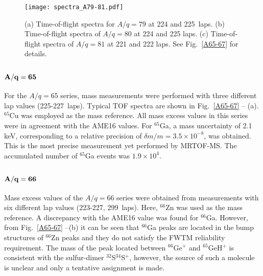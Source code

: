 \documentclass[3p]{elsarticle}
\begin{document}
\begin{figure*}
  \centering
  \texttt{[image: spectra\_A79-81.pdf]}
  \caption{(a) Time-of-flight spectra for $A/q = 79$ at 224 and 225~laps. (b) Time-of-flight spectra of $A/q = 80$ at 224 and 225 laps. (c) Time-of-flight spectra of $A/q = 81$ at 221 and 222 laps. See Fig.~\ref{A65-67} for details. \label{A79-81}}
  \vspace*{-10pt}
\end{figure*} 

\subsection{${\bf A/q = 65}$}
For the $A/q=65$ series, mass measurements were performed with three different lap values (225-227~laps). Typical TOF spectra are shown in Fig.~\ref{A65-67} -- (a). $^{65}$Cu was employed as the mass reference. All mass excess values in this series were in agreement with the AME16 values. For $^{65}$Ga, a mass uncertainty of 2.1 keV, corresponding to a relative precision of $\delta m / m = 3.5\times10^{-8}$, was obtained. This is the most precise measurement yet performed by MRTOF-MS. The accumulated number of $^{65}$Ga events was $1.9 \times 10^{4}$. 

\subsection{${\bf A/q = 66}$}
Mass excess values of the $A/q=66$ series were obtained from measurements with six different lap values (223-227, 299~laps). Here, $^{66}$Zn was used as the mass reference. A discrepancy with the AME16 value was found for $^{66}$Ga. However, from Fig.~\ref{A65-67} --(b) it can be seen that $^{66}$Ga peaks are located in the bump structures of $^{66}$Zn peaks and they do not satisfy the FWTM reliability requirement. The mass of the peak located between $^{66}$Ge$^{+}$ and $^{65}$GeH$^{+}$ is consistent with the sulfur-dimer $^{32}$S$^{34}$S$^{+}$, however, the source of such a molecule is unclear and only a tentative assignment is made. 

\end{document}
